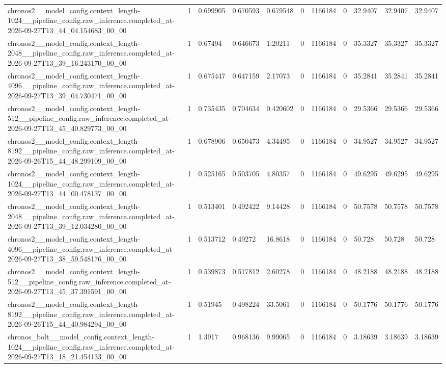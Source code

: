 \begin{tabular}{lllllllllll}
chronos2\_\_model\_config.context\_length-1024\_\_pipeline\_config.raw\_inference.completed\_at-2026-09-27T13\_44\_04.154683\_00\_00 & 1 & 0.699905 & 0.670593 & 0.679548 & 0 & 1166184 & 0 & 32.9407 & 32.9407 & 32.9407 \\
chronos2\_\_model\_config.context\_length-2048\_\_pipeline\_config.raw\_inference.completed\_at-2026-09-27T13\_39\_16.243170\_00\_00 & 1 & 0.67494 & 0.646673 & 1.20211 & 0 & 1166184 & 0 & 35.3327 & 35.3327 & 35.3327 \\
chronos2\_\_model\_config.context\_length-4096\_\_pipeline\_config.raw\_inference.completed\_at-2026-09-27T13\_39\_04.730471\_00\_00 & 1 & 0.675447 & 0.647159 & 2.17073 & 0 & 1166184 & 0 & 35.2841 & 35.2841 & 35.2841 \\
chronos2\_\_model\_config.context\_length-512\_\_pipeline\_config.raw\_inference.completed\_at-2026-09-27T13\_45\_40.829773\_00\_00 & 1 & 0.735435 & 0.704634 & 0.420602 & 0 & 1166184 & 0 & 29.5366 & 29.5366 & 29.5366 \\
chronos2\_\_model\_config.context\_length-8192\_\_pipeline\_config.raw\_inference.completed\_at-2026-09-26T15\_44\_48.299109\_00\_00 & 1 & 0.678906 & 0.650473 & 4.34495 & 0 & 1166184 & 0 & 34.9527 & 34.9527 & 34.9527 \\
chronos2\_\_model\_config.context\_length-1024\_\_pipeline\_config.raw\_inference.completed\_at-2026-09-27T13\_44\_00.478137\_00\_00 & 1 & 0.525165 & 0.503705 & 4.80357 & 0 & 1166184 & 0 & 49.6295 & 49.6295 & 49.6295 \\
chronos2\_\_model\_config.context\_length-2048\_\_pipeline\_config.raw\_inference.completed\_at-2026-09-27T13\_39\_12.034280\_00\_00 & 1 & 0.513401 & 0.492422 & 9.14428 & 0 & 1166184 & 0 & 50.7578 & 50.7578 & 50.7578 \\
chronos2\_\_model\_config.context\_length-4096\_\_pipeline\_config.raw\_inference.completed\_at-2026-09-27T13\_38\_59.548176\_00\_00 & 1 & 0.513712 & 0.49272 & 16.8618 & 0 & 1166184 & 0 & 50.728 & 50.728 & 50.728 \\
chronos2\_\_model\_config.context\_length-512\_\_pipeline\_config.raw\_inference.completed\_at-2026-09-27T13\_45\_37.391591\_00\_00 & 1 & 0.539873 & 0.517812 & 2.60278 & 0 & 1166184 & 0 & 48.2188 & 48.2188 & 48.2188 \\
chronos2\_\_model\_config.context\_length-8192\_\_pipeline\_config.raw\_inference.completed\_at-2026-09-26T15\_44\_40.984294\_00\_00 & 1 & 0.51945 & 0.498224 & 33.5061 & 0 & 1166184 & 0 & 50.1776 & 50.1776 & 50.1776 \\
chronos\_bolt\_\_model\_config.context\_length-1024\_\_pipeline\_config.raw\_inference.completed\_at-2026-09-27T13\_18\_21.454133\_00\_00 & 1 & 1.3917 & 0.968136 & 9.99065 & 0 & 1166184 & 0 & 3.18639 & 3.18639 & 3.18639 \\

\end{tabular}
